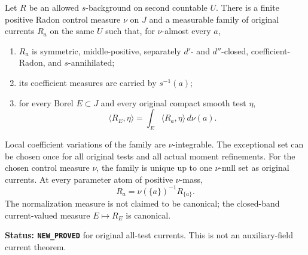 \begin{theorem}
\label{thm:r12-original-current-disintegration}
Let $R$ be an allowed $s$-background on second countable $U$.
There is a finite positive Radon control measure $\nu$ on $J$ and
a measurable family of original currents $R_a$ on the same $U$
such that, for $\nu$-almost every $a$,
\begin{enumerate}
\item $R_a$ is symmetric, middle-positive, separately $d'$- and
$d''$-closed, coefficient-Radon, and $s$-annihilated;
\item its coefficient measures are carried by $s^{-1}(a)$;
\item for every Borel $E\subset J$ and every original compact
smooth test $\eta$,
\[
               \langle R_E,\eta\rangle
                    =\int_E\langle R_a,\eta\rangle\,d\nu(a).
 \tag{DI3}
\]
\end{enumerate}
Local coefficient variations of the family are $\nu$-integrable.
The exceptional set can be chosen once for all original tests and
all actual moment refinements. For the chosen control measure $\nu$,
the family is unique up to one $\nu$-null set as original currents.
At every parameter atom of positive $\nu$-mass,
\[
                       R_a=\nu(\{a\})^{-1}R_{\{a\}}.
 \tag{DI4}
\]
The normalization measure is not claimed to be canonical; the
closed-band current-valued measure $E\mapsto R_E$ is canonical.
\end{theorem}

\noindent\textbf{Status: \texttt{NEW\_PROVED}} for original
all-test currents. This is not an auxiliary-field current theorem.

